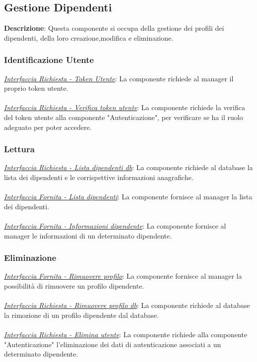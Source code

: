 \documentclass{report}
\begin{document}
\subsection*{Gestione Dipendenti}
\textbf{Descrizione}: Questa componente si occupa della gestione dei profili dei dipendenti, della loro creazione,modifica e eliminazione.
\subsubsection*{\indent \indent Identificazione Utente}
\textcolor{Auth}{\uline{\textit{Interfaccia Richiesta - Token Utente}}}:
La componente richiede al manager il proprio token utente. \\ \\
\textcolor{Auth}{\uline{\textit{Interfaccia Richiesta - Verifica token utente}}}: 
La componente richiede la verifica del token utente alla componente "Autenticazione", per verificare se ha il ruolo adeguato per poter accedere.
\subsubsection*{\indent \indent Lettura}
\textcolor{Database}{\uline{\textit{Interfaccia Richiesta - Lista dipendenti db}}}:
La componente richiede al database la lista dei dipendenti e le corrispettive informazioni anagrafiche.\\\\
\uline{\textit{Interfaccia Fornita - Lista dipendenti}}:
La componente fornisce al manager la lista dei dipendenti.\\\\
\uline{\textit{Interfaccia Fornita - Informazioni dipendente}}:
La componente fornisce al manager le informazioni di un determinato dipendente.
\subsubsection*{\indent \indent Eliminazione}
\uline{\textit{Interfaccia Fornita - Rimuovere profilo}}:
La componente fornisce al manager la possibilità di rimuovere un profilo dipendente.\\\\
\textcolor{Database}{\uline{\textit{Interfaccia Richiesta - Rimuovere profilo db}}}:
La componente richiede al database la rimozione di un profilo dipendente dal database.\\\\
\uline{\textit{Interfaccia Richiesta - Elimina utente}}:
La componente richiede alla componente "Autenticazione" l'eliminazione dei dati di autenticazione associati a un determinato dipendente. 
\end{document}
